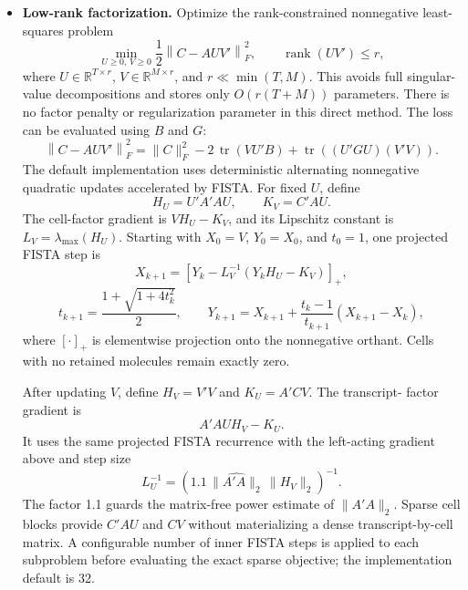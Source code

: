\documentclass[11pt]{article}
\begin{document}
\begin{itemize}[leftmargin=*]
  The update
  \[
    \Phi_{k+1}=(1-\gamma_k)\Phi_k+\gamma_kS_k
  \]
  preserves the nuclear-norm constraint. A curvature-bounded step uses
  \(\|A(S_k-\Phi_k)\|_F^2+\mu\|S_k-\Phi_k\|_F^2\). The penalty coefficient is
  specified relative to the estimated \(\|A\|_2^2\), making its scale portable
  across design matrices. Finite \(\mu\) gives approximate rather than exact
  nonnegativity, so manifests report negative Frobenius and absolute-mass
  fractions. The power-iteration candidate gap is a stopping diagnostic but is
  explicitly not labeled an exact dual certificate.

  \item \textbf{Low-rank factorization.} Optimize the rank-constrained
  nonnegative least-squares problem
  \[
    \min_{U\geq0,\,V\geq0}
    \frac{1}{2}\left\|C-AUV'\right\|_F^2,
    \qquad \operatorname{rank}(UV')\leq r,
  \]
  where
  \(U \in \mathbb{R}^{T \times r}\), \(V \in \mathbb{R}^{M \times r}\), and
  \(r \ll \min(T,M)\). This avoids full singular-value decompositions and
  stores only \(O(r(T+M))\) parameters. There is no factor penalty or
  regularization parameter in this direct method. The loss can be evaluated
  using \(B\) and \(G\):
  \[
    \left\|C-AUV'\right\|_F^2
    =
    \|C\|_F^2
    -2\,\operatorname{tr}\!\left(VU'B\right)
    +\operatorname{tr}\!\left((U'GU)(V'V)\right).
  \]
  The default implementation uses deterministic alternating nonnegative
  quadratic updates accelerated by FISTA. For fixed \(U\), define
  \[
    H_U=U'A'AU,
    \qquad K_V=C'AU.
  \]
  The cell-factor gradient is \(VH_U-K_V\), and its Lipschitz constant is
  \(L_V=\lambda_{\max}(H_U)\). Starting with \(X_0=V\), \(Y_0=X_0\), and
  \(t_0=1\), one projected FISTA step is
  \[
    X_{k+1}=\left[Y_k-L_V^{-1}(Y_kH_U-K_V)\right]_+,
  \]
  \[
    t_{k+1}=\frac{1+\sqrt{1+4t_k^2}}{2},
    \qquad
    Y_{k+1}=X_{k+1}
      +\frac{t_k-1}{t_{k+1}}(X_{k+1}-X_k),
  \]
  where \([\cdot]_+\) is elementwise projection onto the nonnegative orthant.
  Cells with no retained molecules remain exactly zero.

  After updating \(V\), define \(H_V=V'V\) and \(K_U=A'CV\). The transcript-
  factor gradient is
  \[
    A'AU H_V-K_U.
  \]
  It uses the same projected FISTA recurrence with the left-acting gradient
  above and step size
  \[
    L_U^{-1}
    =\left(1.1\,\widehat{\|A'A\|_2}\,\|H_V\|_2\right)^{-1}.
  \]
  The factor 1.1 guards the matrix-free power estimate of \(\|A'A\|_2\).
  Sparse cell blocks provide \(C'AU\) and \(CV\) without materializing a
  dense transcript-by-cell matrix. A configurable number of inner FISTA steps
  is applied to each subproblem before evaluating the exact sparse objective;
  the implementation default is 32.


\end{itemize}
\end{document}
